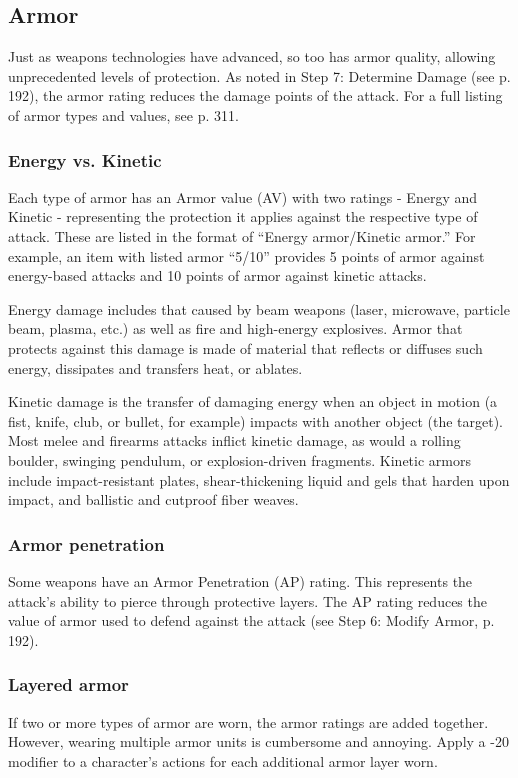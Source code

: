 \subsection{Armor}
\label{sec:armor}

Just as weapons technologies have advanced, so too has armor quality, allowing unprecedented levels of protection. As noted in Step 7: Determine Damage (see p. 192), the armor rating reduces the damage points of the attack. For a full listing of armor types and values, see p. 311.

\subsubsection{Energy vs. Kinetic}
Each type of armor has an Armor value (AV) with two ratings - Energy and Kinetic - representing the protection it applies against the respective type of attack. These are listed in the format of ``Energy armor/Kinetic armor.'' For example, an item with listed armor ``5/10'' provides 5 points of armor against energy-based attacks and 10 points of armor against kinetic attacks.

Energy damage includes that caused by beam weapons (laser, microwave, particle beam, plasma, etc.) as well as fire and high-energy explosives. Armor that protects against this damage is made of material that reflects or diffuses such energy, dissipates and transfers heat, or ablates.

Kinetic damage is the transfer of damaging energy when an object in motion (a fist, knife, club, or bullet, for example) impacts with another object (the target). Most melee and firearms attacks inflict kinetic damage, as would a rolling boulder, swinging pendulum, or explosion-driven fragments. Kinetic armors include impact-resistant plates, shear-thickening liquid and gels that harden upon impact, and ballistic and cutproof fiber weaves.

\subsubsection{Armor penetration}
Some weapons have an Armor Penetration (AP) rating. This represents the attack’s ability to pierce through protective layers. The AP rating reduces the value of armor used to defend against the attack (see Step 6: Modify Armor, p. 192).

\subsubsection{Layered armor}
If two or more types of armor are worn, the armor ratings are added together. However, wearing multiple armor units is cumbersome and annoying. Apply a -20 modifier to a character’s actions for each additional armor layer worn.


